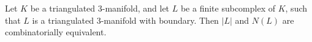 Let $K$ be a triangulated 3-manifold, and let $L$ be a finite subcomplex of $K$, such that $L$ is a triangulated 3-manifold with boundary. Then $|L|$ and $N(L)$ are combinatorially equivalent.
